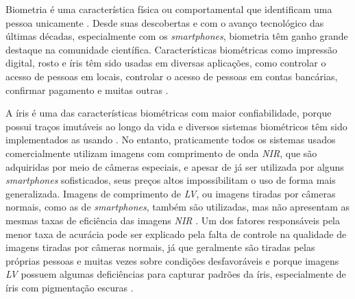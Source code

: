 
\par Biometria é uma característica física ou comportamental que identificam uma pessoa unicamente \cite{wayman2005biometric}. Desde suas descobertas e com o avanço tecnológico das últimas décadas, especialmente com os \textit{smartphones}, biometria têm ganho grande destaque na comunidade científica. Características biométricas como impressão digital, rosto e íris têm sido usadas em diversas aplicações, como controlar o acesso de pessoas em locais, controlar o acesso de pessoas em contas bancárias, confirmar pagamento e muitas outras \cite{wayman2005biometric, li2009encyclopedia}.

\par A íris é uma das características biométricas com maior confiabilidade, porque possui traços imutáveis ao longo da vida e diversos sistemas biométricos têm sido implementados as usando \cite{wayman2005biometric, daugman2004, iris_segmentada,othman2015}. No entanto, praticamente todos os sistemas usados comercialmente utilizam imagens com comprimento de onda \textit{\acrfull{NIR}}, que são adquiridas por meio de câmeras
especiais, e apesar de já ser utilizada por alguns \textit{smartphones} sofisticados, seus preços altos impossibilitam o uso de forma mais generalizada. Imagens de comprimento de \textit{\acrfull{LV}}, ou imagens tiradas por câmeras normais, como as
de \textit{smartphones}, também são utilizadas, mas não apresentam as mesmas taxas de eficiência das
imagens \textit{\acrshort{NIR}} \cite{trokielwicz2016-Warsaw, proenca2011,raja2014, raja2015}. Um dos fatores responsáveis pela menor taxa de acurácia pode ser explicado pela falta de controle na qualidade de imagens tiradas por câmeras normais, já que geralmente são tiradas pelas próprias pessoas e muitas vezes sobre condições desfavoráveis e porque imagens \textit{\acrshort{LV}} possuem algumas deficiências para capturar padrões da íris, especialmente de íris com pigmentação escuras \cite{abdullah2015}. 

